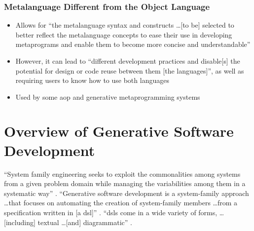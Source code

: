 \subsubsection{Metalanguage Different from the Object Language
      \cite[p.~113:29-31]{lilis_survey_2019}}
\begin{itemize}
      \item Allows for ``the metalanguage syntax and constructs \dots [to be]
            selected to better reflect the metalanguage concepts to ease their
            use in developing metaprograms and enable them to become more
            concise and understandable'' \cite[p.~113:29]{lilis_survey_2019}
      \item However, it can lead to ``different development practices and
            disable[s] the potential for design or code reuse between them [the
                        languages]'', as well as requiring users to know how to
            use both languages \cite[p.~113:30]{lilis_survey_2019}
      \item Used by some \acs{aop} and generative metaprogramming systems
            \cite[p.~113:30]{lilis_survey_2019}
\end{itemize}

\section{Overview of Generative Software Development}
\label{chap:notes:sec:overview-of-gen-soft-dev}

``System family engineering seeks to exploit the commonalities
among systems from a given problem domain while managing the
variabilities among them in a systematic way''
\cite[p.~326]{czarnecki_overview_2004}. ``Generative software development is a
system-family approach \dots that focuses on automating the creation of
system-family members \dots from a specification written in [a \acf{dsl}]''
\cite[p.~327]{czarnecki_overview_2004}. ``\acsp{dsl} come in a wide variety of
forms, \dots [including] textual \dots [and] diagrammatic''
\cite[p.~328]{czarnecki_overview_2004}.

